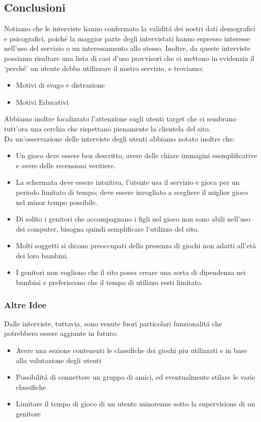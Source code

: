 \documentclass[../Report.tex]{subfiles}
\begin{document}
    \subsection{Conclusioni}

    Notiamo che le interviste hanno confermato la validitá dei nostri dati demografici e psicografici, poiché la maggior parte  degli intervistati hanno espresso interesse nell’uso del servizio o un interessamento allo stesso.
    Inoltre, da queste interviste possiamo risaltare una lista di casi d’uso provvisori che ci mettono in evidenzia il ‘perché’ un utente debba utilizzare il nostro servizio, e troviamo:
    \begin{itemize}
        \item Motivi di svago e distrazione
        \item Motivi Educativi
    \end{itemize}
    Abbiamo inoltre focalizzato l’attenzione sugli utenti target che ci sembrano tutt’ora una cerchia che rispettano pienamente la clientela del sito.\\
    Da un’osservazione delle interviste degli utenti abbiamo notato inoltre che:
    \begin{itemize}
        \item Un gioco deve essere ben descritto, avere delle chiare immagini esemplificative e avere delle recensioni veritiere.
        \item La schermata deve essere intuitiva, l’utente usa il servizio e gioca per un periodo limitato di tempo; deve essere invogliato a scegliere il miglior gioco nel minor tempo possibile.
        \item Di solito i genitori che accompagnano i figli nel gioco non sono abili nell’uso dei computer, bisogna quindi semplificare l'utilizzo del sito. 
        \item Molti soggetti si dicono preoccupati della presenza di giochi non adatti all'età dei loro bambini. 
        \item I genitori non vogliono che il sito possa creare una sorta di dipendenza nei bambini e preferiscono che il tempo di utilizzo resti limitato. 
    \end{itemize}
    

    \subsubsection*{Altre Idee}
    Dalle interviste, tuttavia, sono venute fuori particolari funzionalitá che potrebbero essere aggiunte in futuro:
    \begin{itemize}
        \item Avere una sezione contenenti le classifiche dei giochi piu utilizzati e in base alla valutazione degli utenti
        \item Possibilitá di connettere un gruppo di amici, ed eventualmente stilare le varie classifiche
        \item Limitare il tempo di gioco di un utente minorenne sotto la supervisione di un genitore
        
    \end{itemize}
\end{document}
